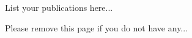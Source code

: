 \begin{publication}
List your publications here...

Please remove this page if you do not have any...


\end{publication}
